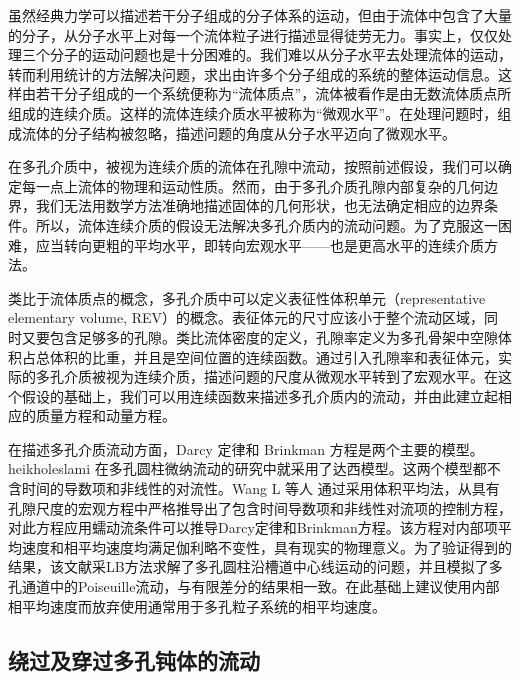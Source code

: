 虽然经典力学可以描述若干分子组成的分子体系的运动，但由于流体中包含了大量的分子，从分子水平上对每一个流体粒子进行描述显得徒劳无力。事实上，仅仅处理三个分子的运动问题也是十分困难的。我们难以从分子水平去处理流体的运动，转而利用统计的方法解决问题，求出由许多个分子组成的系统的整体运动信息。这样由若干分子组成的一个系统便称为“流体质点”，流体被看作是由无数流体质点所组成的连续介质。这样的流体连续介质水平被称为“微观水平”。在处理问题时，组成流体的分子结构被忽略，描述问题的角度从分子水平迈向了微观水平。


在多孔介质中，被视为连续介质的流体在孔隙中流动，按照前述假设，我们可以确定每一点上流体的物理和运动性质。然而，由于多孔介质孔隙内部复杂的几何边界，我们无法用数学方法准确地描述固体的几何形状，也无法确定相应的边界条件。所以，流体连续介质的假设无法解决多孔介质内的流动问题。为了克服这一困难，应当转向更粗的平均水平，即转向宏观水平——也是更高水平的连续介质方法。

类比于流体质点的概念，多孔介质中可以定义表征性体积单元（representative elementary volume, REV）的概念。表征体元的尺寸应该小于整个流动区域，同时又要包含足够多的孔隙。类比流体密度的定义，孔隙率定义为多孔骨架中空隙体积占总体积的比重，并且是空间位置的连续函数。通过引入孔隙率和表征体元，实际的多孔介质被视为连续介质，描述问题的尺度从微观水平转到了宏观水平。在这个假设的基础上，我们可以用连续函数来描述多孔介质内的流动，并由此建立起相应的质量方程和动量方程。


在描述多孔介质流动方面，Darcy 定律和 Brinkman 方程是两个主要的模型。heikholeslami\cite{Sheikholeslami2017} 在多孔圆柱微纳流动的研究中就采用了达西模型。这两个模型都不含时间的导数项和非线性的对流性。Wang L 等人 \cite{Wang2015} 通过采用体积平均法，从具有孔隙尺度的宏观方程中严格推导出了包含时间导数项和非线性对流项的控制方程，对此方程应用蠕动流条件可以推导Darcy定律和Brinkman方程。该方程对内部项平均速度和相平均速度均满足伽利略不变性，具有现实的物理意义。为了验证得到的结果，该文献采LB方法求解了多孔圆柱沿槽道中心线运动的问题，并且模拟了多孔通道中的Poiseuille流动，与有限差分的结果相一致。在此基础上建议使用内部相平均速度而放弃使用通常用于多孔粒子系统的相平均速度。%

\subsection{绕过及穿过多孔钝体的流动}

